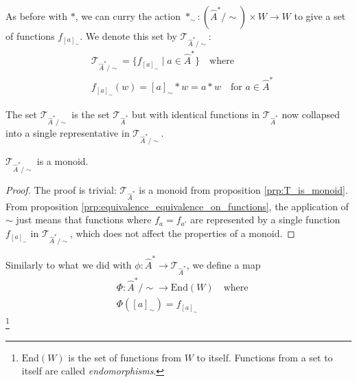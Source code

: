 
As before with $\ast$, we can curry the action $\ast_{\sim}: (\hat{A}^{\ast}/\sim) \times W \to W$ to give a set of functions $f_{[a]_{\sim}}$.
We denote this set by $\mathcal{T}_{\hat{A}^{\ast}/\sim}$:
\begin{equation}
	\begin{aligned}
		 & \mathcal{T}_{\hat{A}^{\ast}/\sim} = \{ f_{[a]_{\sim}} \mid a \in \hat{A}^{\ast} \} \quad \text{where} \\
		 & f_{[a]_{\sim}}(w) = [a]_{\sim} \ast w = a \ast w \quad \text{for $a \in \hat{A}^{\ast}$}
	\end{aligned}
\end{equation}

The set $\mathcal{T}_{\hat{A}^{\ast}/\sim}$ is the set $\mathcal{T}_{\hat{A}^{\ast}}$ but with identical functions in $\mathcal{T}_{\hat{A}^{\ast}}$ now collapsed into a single representative in $\mathcal{T}_{\hat{A}^{\ast}/\sim}$.

\begin{proposition}
	$\mathcal{T}_{\hat{A}^{\ast}/\sim}$ is a monoid.
\end{proposition}
\begin{proof}
	The proof is trivial: $\mathcal{T}_{\hat{A}^{\ast}}$ is a monoid from proposition \ref{prp:T_is_monoid}.
	From proposition \ref{prp:equivalence_equivalence_on_functions}, the application of $\sim$ just means that functions where $f_{a}=f_{a'}$ are represented by a single function $f_{[a]_{\sim}}$ in $\mathcal{T}_{\hat{A}^{\ast}/\sim}$, which does not affect the properties of a monoid.
\end{proof}

Similarly to what we did with $\phi: \hat{A}^{\ast} \to \mathcal{T}_{\hat{A}^{\ast}}$, we define a map
\begin{equation}
	\begin{aligned}
		 & \Phi : \hat{A}^{\ast}/\sim \to \text{End}(W) \quad \text{where} \\
		 & \Phi([a]_{\sim}) = f_{[a]_{\sim}}
	\end{aligned}
\end{equation}
\footnote{$\text{End}(W)$ is the set of functions from $W$ to itself.
	Functions from a set to itself are called \emph{endomorphisms}.}

